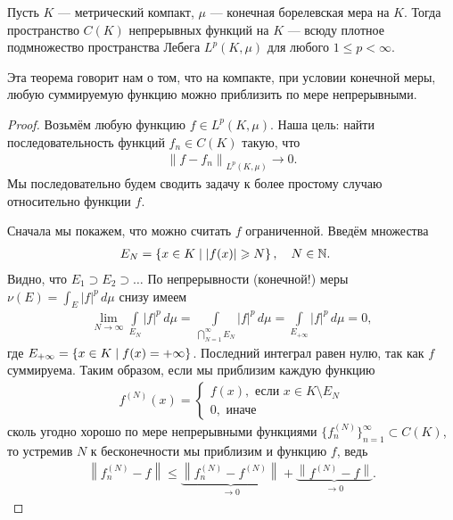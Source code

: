 \begin{thm}[%
]
\label{theorem:continous_functions_dense_set_in_lebesgue_space}
  Пусть $K$ --- метрический компакт, $\mu$ --- конечная борелевская мера на $K$. Тогда пространство $C(K)$ непрерывных функций на $K$ --- всюду плотное подмножество пространства Лебега $L^{p}(K, \mu)$ для любого $1 \leqslant p < \infty$.
\end{thm}
Эта теорема говорит нам о том, что на компакте, при условии конечной меры, любую суммируемую функцию можно приблизить по мере непрерывными.
\begin{proof}
 Возьмём любую функцию $f \in L^{p}(K,\mu)$. Наша цель: найти последовательность функций $f_n \in C(K)$ такую, что \begin{align*}
  \left\| f - f_n \right\|_{L^{p}(K,\mu)} \to 0
 .\end{align*} Мы последовательно будем сводить задачу к более простому случаю относительно функции $f$.

 Сначала мы покажем, что можно считать $f$ ограниченной. Введём множества  \begin{align*}
 E_N &= \left\{ x \in K \mid \left| f(x) \right| \geqslant N \right\}, \quad N \in \mathbb{N}
.\end{align*} Видно, что $E_1 \supset E_2 \supset \ldots $ По непрерывности (конечной!) меры $\nu(E) = \int_{E} \left| f \right|^{p} \, d\mu  $  снизу имеем \begin{align*}
 \lim_{N \to \infty} \int\limits_{E_N} \left| f \right|^{p} \, d\mu = \int\limits_{\bigcap_{N=1}^{\infty} E_N} \left| f \right|^{p} \, d\mu = \int\limits_{E_{+\infty}} \left| f \right|^{p} \, d\mu   = 0
,\end{align*}  где $E_{+\infty} = \left\{ x \in K \;\middle|\; f(x) = +\infty \right\}$. Последний интеграл равен нулю, так как $f$ суммируема. Таким образом, если мы приблизим каждую функцию 
\begin{align*}
f^{(N)}(x) = \begin{cases}
 f(x), \text{ если } x \in K \setminus E_N \\
 0, \text{ иначе }
\end{cases} 
\end{align*}
 сколь угодно хорошо по мере непрерывными функциями $\{f_{n}^{(N)}\}_{n=1}^{\infty} \subset C(K)$, то устремив $N$ к бесконечности мы приблизим и функцию $f$, ведь \begin{align*}
  \left\| f_n^{(N)} - f \right\| \leqslant \underbrace{\left\| f_n^{(N)} - f^{(N)} \right\|}_{\to 0} + \underbrace{\left\| f^{(N)} - f \right\|}_{\to 0}
 .\end{align*} 


\end{proof}
